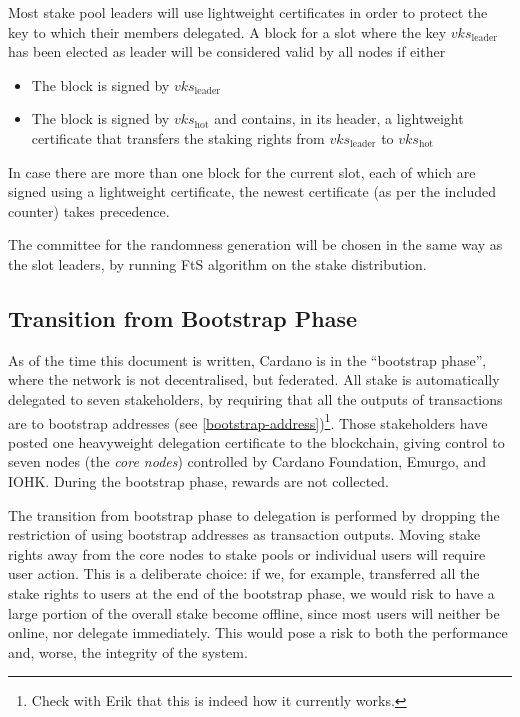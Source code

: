 \documentclass[11pt,a4paper]{article}
\begin{document}
Most stake pool leaders will use lightweight certificates in order to
protect the key to which their members delegated. A block for a slot
where the key \(vks_\text{leader}\) has been elected as leader will be
considered valid by all nodes if either

\begin{itemize}
\item
  The block is signed by \(vks_\text{leader}\)
\item
  The block is signed by \(vks_\text{hot}\) and contains, in its header,
  a lightweight certificate that transfers the staking rights from
  \(vks_\text{leader}\) to \(vks_\text{hot}\)
\end{itemize}

In case there are more than one block for the current slot, each of
which are signed using a lightweight certificate, the newest certificate
(as per the included counter) takes precedence.

The committee for the randomness generation will be chosen in the same
way as the slot leaders, by running FtS algorithm on the stake
distribution.

\subsection{Transition from Bootstrap
Phase}\label{transition-from-bootstrap-phase}

As of the time this document is written, Cardano is in the ``bootstrap
phase'', where the network is not decentralised, but federated. All
stake is automatically delegated to seven stakeholders, by requiring
that all the outputs of transactions are to bootstrap addresses (see
\ref{bootstrap-address})\footnote{Check with Erik that this is indeed
  how it currently works.}. Those stakeholders have posted one
heavyweight delegation certificate to the blockchain, giving control to
seven nodes (the \emph{core nodes}) controlled by Cardano Foundation,
Emurgo, and IOHK. During the bootstrap phase, rewards are not collected.

The transition from bootstrap phase to delegation is performed by
dropping the restriction of using bootstrap addresses as transaction
outputs. Moving stake rights away from the core nodes to stake pools or
individual users will require user action. This is a deliberate choice:
if we, for example, transferred all the stake rights to users at the end
of the bootstrap phase, we would risk to have a large portion of the
overall stake become offline, since most users will neither be online,
nor delegate immediately. This would pose a risk to both the performance
and, worse, the integrity of the system.
\end{document}

